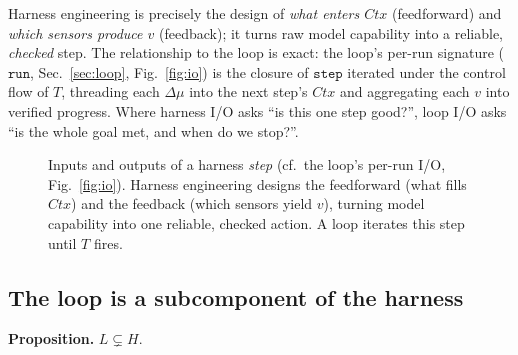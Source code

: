 \documentclass[10pt,twocolumn,letterpaper]{article}
\begin{document}
Harness engineering is precisely the design of \emph{what enters $\mathit{Ctx}$}
(feedforward) and \emph{which sensors produce $v$} (feedback); it turns raw model
capability into a reliable, \emph{checked} step. The relationship to the loop is
exact: the loop's per-run signature ($\texttt{run}$, Sec.~\ref{sec:loop},
Fig.~\ref{fig:io}) is the closure of $\texttt{step}$ iterated under the control
flow of $T$, threading each $\Delta\mu$ into the next step's $\mathit{Ctx}$ and
aggregating each $v$ into verified progress. Where harness I/O asks ``is this one
step good?'', loop I/O asks ``is the whole goal met, and when do we stop?''.

\begin{figure}[t]
\centering
{}
\caption{Inputs and outputs of a harness \emph{step} (cf.\ the loop's per-run
I/O, Fig.~\ref{fig:io}). Harness engineering designs the feedforward (what fills
$\mathit{Ctx}$) and the feedback (which sensors yield $v$), turning model
capability into one reliable, checked action. A loop iterates this step until
$T$ fires.}
\label{fig:hio}
\end{figure}

\subsection{The loop is a subcomponent of the harness}
\noindent\textbf{Proposition.} $L \subsetneq H$.
\end{document}
